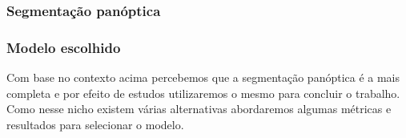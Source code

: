 \subsubsection*{Segmentação panóptica}


\subsubsection*{Modelo escolhido}

Com base no contexto acima percebemos que a segmentação panóptica é a mais completa e por efeito de estudos utilizaremos o mesmo para concluir o trabalho. Como nesse nicho existem várias alternativas abordaremos algumas métricas e resultados para selecionar o modelo.






